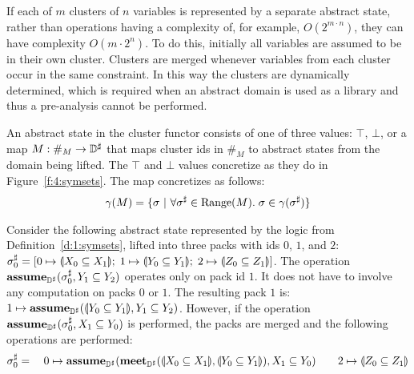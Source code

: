If each of $m$ clusters of $n$ variables is represented by a separate abstract state, rather than operations having a complexity of, for example, $O(2^{m\cdot n})$, they can have complexity $O(m\cdot 2^n)$.  To do this, initially all variables are assumed to be in their own cluster.  Clusters are merged whenever variables from each cluster occur in the same constraint.  In this way the clusters are dynamically determined, which is required when an abstract domain is used as a library and thus a pre-analysis cannot be performed.

An abstract state in the cluster functor consists of one of three values: $\top$, $\bot$, or a map $M : \#_M \rightarrow {\mathbb{D}}^{\sharp}$ that maps cluster ids in $\#_M$ to abstract states from the domain being lifted.  The $\top$ and $\bot$ values concretize as they do in Figure~\ref{f:4:symsets}.  The map concretizes as follows:
\begin{align*}
  \gamma(M) = \{ \sigma \ | \ \forall {\sigma}^{\sharp} \in \textrm{Range}(M). \; \sigma \in \gamma({\sigma}^{\sharp}) \}
\end{align*}

\begin{example}
Consider the following abstract state represented by the logic from Definition~\ref{d:1:symsets}, lifted into three packs with ids $0$, $1$, and $2$:
$
  {\sigma}^{\sharp}_0 = [0 \mapsto \llparenthesis X_0 \subseteq X_1 \rrparenthesis; \; 1 \mapsto \llparenthesis Y_0 \subseteq Y_1 \rrparenthesis; \; 2 \mapsto \llparenthesis Z_0 \subseteq Z_1 \rrparenthesis]
$.
The operation $\textbf{assume}_{{\mathbb{D}}^{\sharp}}({\sigma}^{\sharp}_0, Y_1 \subseteq Y_2)$ operates only on pack id $1$.  It does not have to involve any computation on packs $0$ or $1$.  The resulting pack $1$ is: $1 \mapsto \textbf{assume}_{{\mathbb{D}}^{\sharp}}(\llparenthesis Y_0 \subseteq Y_1 \rrparenthesis, Y_1 \subseteq Y_2)$.  However, if the operation $\textbf{assume}_{{\mathbb{D}}^{\sharp}}({\sigma}^{\sharp}_0, X_1 \subseteq Y_0)$ is performed, the packs are merged and the following operations are performed:
\begin{align*}
{\sigma}^{\sharp}_0 = \quad 0 \mapsto \textbf{assume}_{{\mathbb{D}}^{\sharp}}(\textbf{meet}_{{\mathbb{D}}^{\sharp}}(\llparenthesis X_0 \subseteq X_1 \rrparenthesis, \llparenthesis Y_0 \subseteq Y_1 \rrparenthesis), X_1 \subseteq Y_0) \qquad 2 \mapsto \llparenthesis Z_0 \subseteq Z_1 \rrparenthesis
\end{align*}
\end{example}